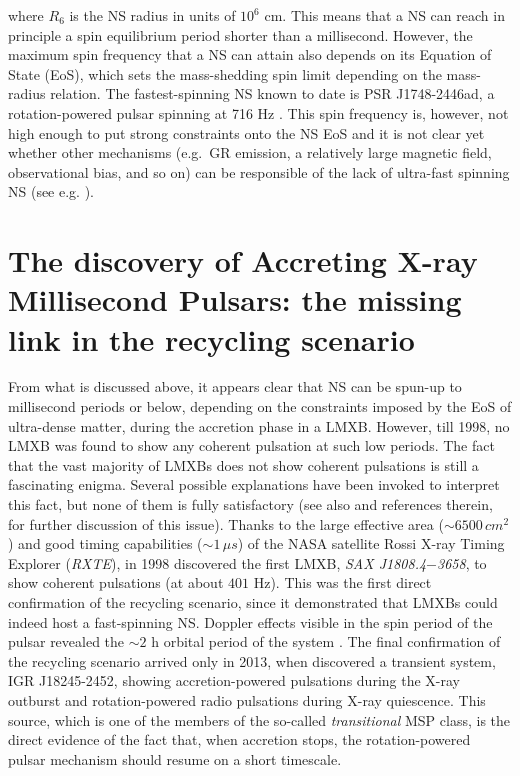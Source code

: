 \documentclass[graybox]{svmult}
\def \rxte {{\em RXTE\xspace}}
\def \saxj{{\em SAX J1808.4$-$3658\xspace}}
\begin{document}
where $R_6$ is the NS radius in units of $10^6$ cm. This means that a NS can reach in principle a spin equilibrium period shorter than a millisecond. However, the maximum spin frequency that a NS can attain also depends on its Equation of State (EoS), which sets the mass-shedding spin limit depending on the mass-radius relation. The fastest-spinning NS known to date is PSR J1748-2446ad, a rotation-powered pulsar spinning at 716 Hz \cite{Hessels2006}. This spin frequency is, however, not high enough to put strong constraints onto the NS EoS and it is not clear yet whether other mechanisms (e.g.\ GR emission, a relatively large magnetic field, observational bias, and so on) can be responsible of the lack of ultra-fast spinning NS (see e.g. \cite{Burderi2001}). 


\section{The discovery of Accreting X-ray Millisecond Pulsars: the missing link in the recycling scenario}

From what is discussed above, it appears clear that NS can be spun-up to millisecond periods or below, depending on the constraints imposed by the EoS of ultra-dense matter, during the accretion phase in a LMXB. However, till 1998, no LMXB was found to show any coherent pulsation at such low periods. The fact that the vast majority of LMXBs does not show coherent pulsations is still a fascinating enigma. Several possible explanations have been invoked to interpret this fact, but none of them is fully satisfactory (see also \cite{Patruno2012} and references therein, for further discussion of this issue). Thanks to the large effective area ($\sim 6500\, cm^2$) and good timing capabilities ($\sim 1\, \mu s$) of the NASA satellite Rossi X-ray Timing Explorer (\rxte{}), in 1998 \cite{Wijnands1998} discovered the first LMXB, \saxj, to show coherent pulsations (at about $401$ Hz). This was the first direct confirmation of the recycling scenario, since it demonstrated that LMXBs could indeed host a fast-spinning NS. Doppler effects visible in the spin period of the pulsar revealed the $\sim 2$ h orbital period of the system  \cite{Chakrabarty1998}. 
The final confirmation of the recycling scenario arrived only in 2013, when \cite{Papitto2013b} discovered a transient system, IGR J18245-2452, showing accretion-powered pulsations during the X-ray outburst and rotation-powered radio pulsations during X-ray quiescence. This source, which is one of the members of the so-called {\it transitional} MSP class, is the direct evidence of the fact that, when accretion stops, the rotation-powered pulsar mechanism should resume on a short timescale.
\end{document}

